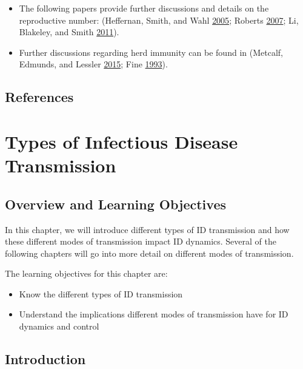 \documentclass[]{book}
\providecommand{\tightlist}{%
  \setlength{\itemsep}{0pt}\setlength{\parskip}{0pt}}
\theoremstyle{definition}
\theoremstyle{definition}
\theoremstyle{definition}
\theoremstyle{remark}
\begin{document}
\begin{itemize}
\tightlist
\item
  The following papers provide further discussions and details on the
  reproductive number: (Heffernan, Smith, and Wahl
  \protect\hyperlink{ref-heffernan05}{2005}; Roberts
  \protect\hyperlink{ref-roberts07}{2007}; Li, Blakeley, and Smith
  \protect\hyperlink{ref-li11}{2011}).
\item
  Further discussions regarding herd immunity can be found in (Metcalf,
  Edmunds, and Lessler \protect\hyperlink{ref-metcalf15}{2015}; Fine
  \protect\hyperlink{ref-fine93}{1993}).
\end{itemize}

\hypertarget{references-1}{%
\section{References}\label{references-1}}

\hypertarget{types-of-infectious-disease-transmission}{%
\chapter{Types of Infectious Disease
Transmission}\label{types-of-infectious-disease-transmission}}

\hypertarget{overview-and-learning-objectives-4}{%
\section{Overview and Learning
Objectives}\label{overview-and-learning-objectives-4}}

In this chapter, we will introduce different types of ID transmission
and how these different modes of transmission impact ID dynamics.
Several of the following chapters will go into more detail on different
modes of transmission.

The learning objectives for this chapter are:

\begin{itemize}
\tightlist
\item
  Know the different types of ID transmission
\item
  Understand the implications different modes of transmission have for
  ID dynamics and control
\end{itemize}

\hypertarget{introduction-3}{%
\section{Introduction}\label{introduction-3}}
\end{document}
